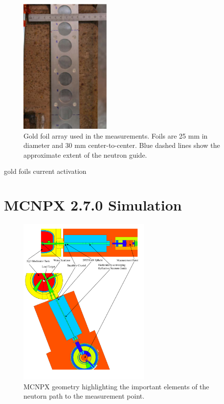 \documentclass[a4paper,
              ]{jacow}
\begin{document}
\begin{figure}[!htb]
   \centering
   \includegraphics*[width=45mm]{graphics/foils.eps}
   \caption{Gold foil array used in the measurements.  Foils are 25 mm in diameter and 30 mm center-to-center.  Blue dashed lines show the approximate extent of the neutron guide.}
   \label{foils}
\end{figure}

gold foils
current
activation

\section{MCNPX 2.7.0 Simulation}

\begin{figure}[!htb]
   \centering
   \includegraphics*[width=65mm]{graphics/geom.pdf}
   \caption{MCNPX geometry highlighting the important elements of the neutorn path to the measurement point.}
   \label{geom}
\end{figure}
\end{document}
